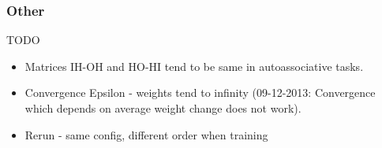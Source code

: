 
\subsubsection{Other}

TODO 

\begin{itemize} 
\item Matrices IH-OH and HO-HI tend to be same in autoassociative tasks. 
\item Convergence Epsilon - weights tend to infinity (09-12-2013: Convergence which depends on average weight change does not work). 
\item Rerun - same config, different order when training 

\end{itemize}
